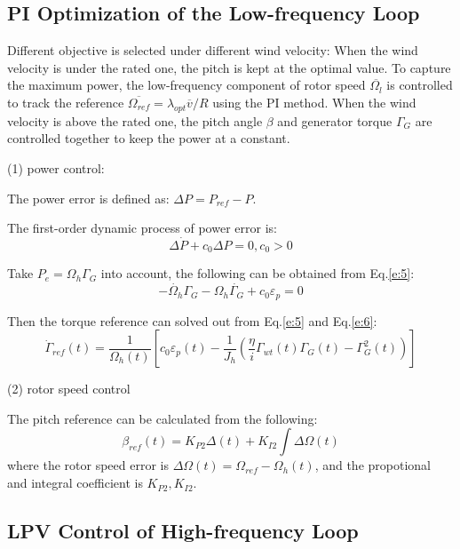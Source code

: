 \documentclass[english]{cccconf}
\begin{document}
\subsection{PI Optimization of the Low-frequency Loop}

Different objective is selected under different wind velocity:
When the wind velocity is under the rated one, the pitch is kept at the
optimal value. To capture the maximum power, the low-frequency component
of rotor speed $\overline{\Omega_l}$ is controlled to track the reference
$\overline{\Omega_{ref}}=\lambda_{opt}\overline{v}/R$ using the PI method.
When the wind velocity is above the rated one, the pitch angle $\beta$ and
generator torque $\Gamma_G$ are controlled together to keep the power at
a constant.

(1) power control:

The power error is defined as: $\Delta{}P=P_{ref}-P$.

The first-order dynamic process of power error is:
\begin{equation}\label{e:5}
  \Delta\dot{P}+c_0\Delta{}P=0, c_0>0
\end{equation}

Take $P_e=\Omega_h\Gamma_G$ into account, the following can be obtained
from Eq.\ref{e:5}:
\begin{equation}\label{e:6}
  -\dot{\Omega_h}\Gamma_G-\Omega_h\dot{\Gamma_G}+c_0\varepsilon_p=0
\end{equation}

Then the torque reference can solved out from Eq.\ref{e:5} and
Eq.\ref{e:6}:
\begin{equation}\label{e:7}
  \dot{\Gamma}_{ref}(t) = \dfrac{1}{\Omega_h(t)}[c_0\varepsilon_p(t) -
        \dfrac{1}{J_h}(\dfrac{\eta}{i}\Gamma_{wt}(t)\Gamma_G(t)-\Gamma^2_G(t))]
\end{equation}

(2) rotor speed control

The pitch reference can be calculated from the following:
\begin{equation}\label{e:8}
  \beta_{ref}(t) = K_{P2}\Delta(t) + K_{I2}\int\Delta\Omega(t)
\end{equation}
where the rotor speed error is $\Delta\Omega(t)=\Omega_{ref}-\Omega_h(t)$,
and the propotional and integral coefficient is $K_{P2}, K_{I2}$.


\subsection{LPV Control of High-frequency Loop}
\end{document}

